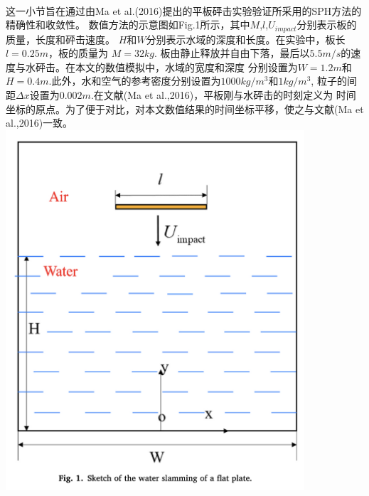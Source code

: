 \documentclass[UTF8]{ctexart}
\begin{document}
\paragraph{\quad}这一小节旨在通过由Ma et al.(2016)提出的平板砰击实验验证所采用的SPH方法的精确性和收敛性。
                数值方法的示意图如Fig.1所示，其中$M$,$l$,$U_{impact}$分别表示板的质量，长度和砰击速度。
                $H$和$W$分别表示水域的深度和长度。在实验中，板长$ l = 0.25 m$，板的质量为 $M = 32 kg$.
                板由静止释放并自由下落，最后以$5.5m/s$的速度与水砰击。在本文的数值模拟中，水域的宽度和深度
                分别设置为$W=1.2m$和$H=0.4m$.此外，水和空气的参考密度分别设置为$1000kg/m^3$和$1kg/m^3$,
                粒子的间距$\Delta x$设置为$0.002m$.在文献(Ma et al.,2016)，平板刚与水砰击的时刻定义为
                时间坐标的原点。为了便于对比，对本文数值结果的时间坐标平移，使之与文献(Ma et al.,2016)一致。\\
{
    \centering
    \includegraphics[width=30em]{./source/Fig1.png}
}
\end{document}
